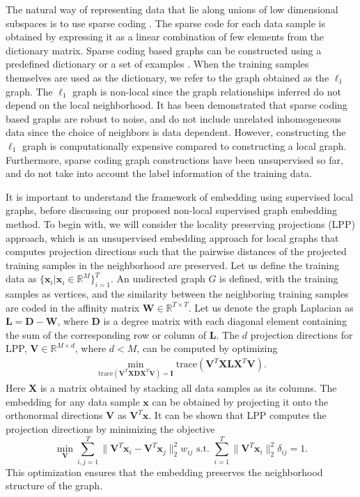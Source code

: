 The natural way of representing data that lie along unions of low dimensional subspaces is to use sparse coding \cite{Elad_book}. The sparse code for each data sample is obtained by expressing it as a linear combination of few elements from the dictionary matrix. Sparse coding based graphs can be constructed using a predefined dictionary or a set of examples \cite{cheng2010,ramirez2010classification}. When the training samples themselves are used as the dictionary, we refer to the graph obtained as the $\ell_1$ graph. The $\ell_1$ graph is non-local since the graph relationships inferred do not depend on the local neighborhood. It has been demonstrated that sparse coding based graphs are robust to noise, and do not include unrelated inhomogeneous data since the choice of neighbors is data dependent. However, constructing the $\ell_1$ graph is computationally expensive compared to constructing a local graph. Furthermore, sparse coding graph constructions have been unsupervised so far, and do not take into account the label information of the training data.

It is important to understand the framework of embedding using supervised local graphs, before discussing our proposed non-local supervised graph embedding method. To begin with, we will consider the locality preserving projections (LPP) approach, which is an unsupervised embedding approach for local graphs that computes projection directions such that the pairwise distances of the projected training samples in the neighborhood are preserved. Let us define the training data as $\{\mathbf{x}_i|\mathbf{x}_i \in \mathbb{R}^M\}_{i=1}^T$. An undirected graph $G$ is defined, with the training samples as vertices, and the similarity between the neighboring training samples are coded in the affinity matrix $\mathbf{W} \in \mathbb{R}^{T \times T}$.  Let us denote the graph Laplacian as $\mathbf{L} = \mathbf{D}-\mathbf{W}$, where $\mathbf{D}$ is a degree matrix with each diagonal element containing the sum of the corresponding row or column of $\mathbf{L}$. The $d$ projection directions for LPP, $\mathbf{V} \in \mathbb{R}^{M \times d}$, where $d < M$, can be computed by optimizing
\begin{align}
\min_{\text{trace}(\mathbf{V}^T \mathbf{X} \mathbf{D}\mathbf{X}^T\mathbf{V}) = \mathbf{I}} \text{trace}(\mathbf{V}^T \mathbf{X} \mathbf{L}\mathbf{X}^T\mathbf{V}).
\label{eqn:lpp}
\end{align}Here $\mathbf{X}$ is a matrix obtained by stacking all data samples as its columns. The embedding for any data sample $\mathbf{x}$ can be obtained by projecting it onto the orthonormal directions $\mathbf{V}$ as $\mathbf{V}^T \mathbf{x}$. It can be shown that LPP computes the projection directions by minimizing the objective 
\begin{equation}
\min_{\mathbf{V}} \sum_{i,j=1}^T \|\mathbf{V}^T \mathbf{x}_i - \mathbf{V}^T \mathbf{x}_j\|_2^2 w_{ij} \text{  s.t.  } \sum_{i=1}^T \|\mathbf{V}^T \mathbf{x}_i\|_2^2 \delta_{ij} =1.
\label{eqn:lppopt}
\end{equation}This optimization ensures that the embedding preserves the neighborhood structure of the graph.

